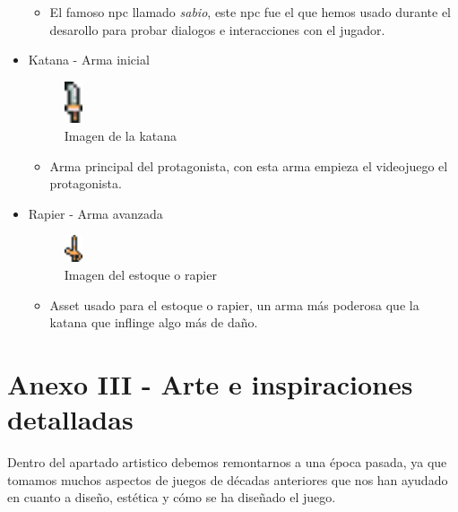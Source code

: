 \documentclass[a4paper]{article}
\begin{document}
\begin{appendices}
\begin{itemize}
              \begin{itemize}
                  \item El famoso npc llamado \textit{sabio}, este npc fue el que hemos usado durante el desarollo para probar dialogos e interacciones con el jugador.
              \end{itemize}
        \item Katana - Arma inicial
              \begin{figure}[!ht]
                  \centering
                  \includegraphics[width=0.05\textwidth]{Images/katana.png}
                  \caption{Imagen de la katana}
                  \label{fig:katana}
              \end{figure}
              \begin{itemize}
                  \item Arma principal del protagonista, con esta arma empieza el videojuego el protagonista.
              \end{itemize}
        \item Rapier - Arma avanzada
              \begin{figure}[!ht]
                  \centering
                  \includegraphics[width=0.05\textwidth]{Images/rapier.png}
                  \caption{Imagen del estoque o rapier}
                  \label{fig:rapier}
              \end{figure}
              \begin{itemize}
                  \item Asset usado para el estoque o rapier, un arma más poderosa que la katana que inflinge algo más de daño.
              \end{itemize}
    \end{itemize}
    \clearpage

    \section{Anexo III - Arte e inspiraciones detalladas}
    Dentro del apartado artistico debemos remontarnos a una época pasada, ya que tomamos muchos aspectos de juegos de décadas anteriores que nos han ayudado en cuanto a diseño, estética y cómo se ha
    diseñado el juego.


\end{appendices}
\end{document}
